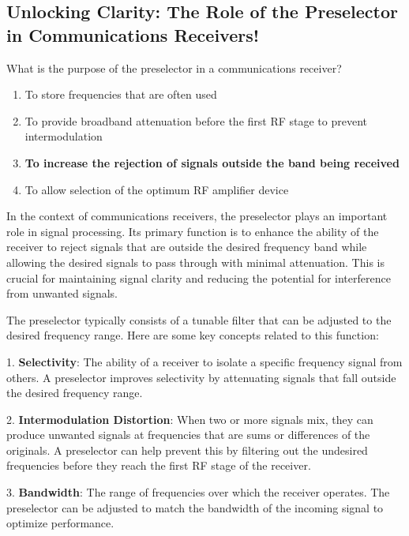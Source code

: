 \subsection*{Unlocking Clarity: The Role of the Preselector in Communications Receivers!}

\begin{tcolorbox}[colback=gray!10, colframe=black, title=E4D09]  

What is the purpose of the preselector in a communications receiver?  

\begin{enumerate}[label=\Alph*.]
    \item To store frequencies that are often used  
    \item To provide broadband attenuation before the first RF stage to prevent intermodulation  
    \item \textbf{To increase the rejection of signals outside the band being received}  
    \item To allow selection of the optimum RF amplifier device  
\end{enumerate} \end{tcolorbox}

In the context of communications receivers, the preselector plays an important role in signal processing. Its primary function is to enhance the ability of the receiver to reject signals that are outside the desired frequency band while allowing the desired signals to pass through with minimal attenuation. This is crucial for maintaining signal clarity and reducing the potential for interference from unwanted signals.

The preselector typically consists of a tunable filter that can be adjusted to the desired frequency range. Here are some key concepts related to this function:

1. \textbf{Selectivity}: The ability of a receiver to isolate a specific frequency signal from others. A preselector improves selectivity by attenuating signals that fall outside the desired frequency range.

2. \textbf{Intermodulation Distortion}: When two or more signals mix, they can produce unwanted signals at frequencies that are sums or differences of the originals. A preselector can help prevent this by filtering out the undesired frequencies before they reach the first RF stage of the receiver.

3. \textbf{Bandwidth}: The range of frequencies over which the receiver operates. The preselector can be adjusted to match the bandwidth of the incoming signal to optimize performance.

